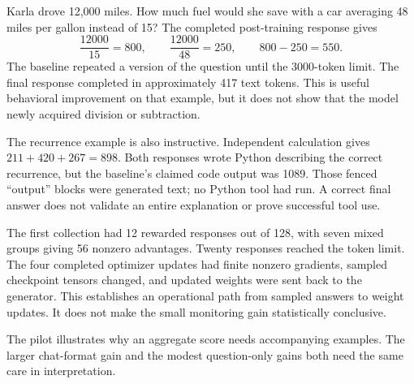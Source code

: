 \documentclass[11pt]{article}
\newcommand{\topic}[1]{\par\smallskip{\large\color{ink}\textbf{#1}}\par}
\begin{document}
Karla drove 12,000 miles. How much fuel would she save with a car averaging
48 miles per gallon instead of 15? The completed post-training response gives
\[
 \frac{12000}{15}=800,\qquad \frac{12000}{48}=250,\qquad
 800-250=\boxed{550}.
\]
The baseline repeated a version of the question until the 3000-token limit.
The final response completed in approximately 417 text tokens. This is useful
behavioral improvement on that example, but it does not show that the model
newly acquired division or subtraction.

The recurrence example is also instructive. Independent calculation gives
$211+420+267=898$. Both responses wrote Python describing the correct recurrence,
but the baseline's claimed code output was 1089. Those fenced ``output'' blocks
were generated text; no Python tool had run. A correct final answer does not
validate an entire explanation or prove successful tool use.

\topic{What the training evidence adds}

The first collection had 12 rewarded responses out of 128, with seven mixed
groups giving 56 nonzero advantages. Twenty responses reached the token limit.
The four completed optimizer updates had finite nonzero gradients, sampled
checkpoint tensors changed, and updated weights were sent back to the generator.
This establishes an operational path from sampled answers to weight updates.
It does not make the small monitoring gain statistically conclusive.

The pilot illustrates why an aggregate score needs accompanying examples.
The larger chat-format gain and the modest question-only gains both need
the same care in interpretation.
\end{document}
